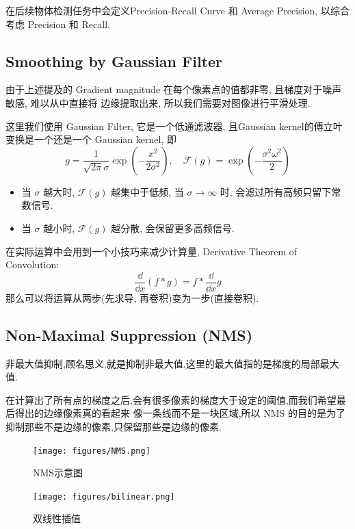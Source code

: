 在后续物体检测任务中会定义Precision-Recall Curve 和 Average Precision, 以综合考虑 Precision 和 Recall.

\subsection{Smoothing by Gaussian Filter}
由于上述提及的 Gradient magnitude 在每个像素点的值都非零, 且梯度对于噪声敏感, 难以从中直接将
边缘提取出来, 所以我们需要对图像进行平滑处理. 

这里我们使用 Gaussian Filter, 它是一个低通滤波器, 且Gaussian kernel的傅立叶变换是一个还是一个 Gaussian kernel, 即
\[
    g = \frac{1}{\sqrt{2\pi}\sigma} \exp\left( -\frac{x^2}{2\sigma^2} \right), \quad \mathcal{F}(g) = \exp \left( -\frac{\sigma^2\omega^2}{2} \right)
\]
\begin{itemize}
    \item 当 $\sigma$ 越大时, $\mathcal{F}(g)$ 越集中于低频, 当 $\sigma \to \infty$ 时, 会滤过所有高频只留下常数信号.
    \item 当 $\sigma$ 越小时, $\mathcal{F}(g)$ 越分散, 会保留更多高频信号.
\end{itemize}
在实际运算中会用到一个小技巧来减少计算量, Derivative Theorem of Convolution:
\[
\frac{\dd }{\dd x} (f * g) = f * \frac{\dd }{\dd x} g
\]
那么可以将运算从两步(先求导, 再卷积)变为一步(直接卷积).


\subsection{Non-Maximal Suppression (NMS)}

非最大值抑制,顾名思义,就是抑制非最大值,这里的最大值指的是梯度的局部最大值.

在计算出了所有点的梯度之后,会有很多像素的梯度大于设定的阈值,而我们希望最后得出的边缘像素真的看起来
像一条线而不是一块区域,所以 NMS 的目的是为了抑制那些不是边缘的像素,只保留那些是边缘的像素.

\begin{figure}[htbp]
    \centering
    \begin{minipage}[t]{0.45\textwidth}
        \centering
        \texttt{[image: figures/NMS.png]}
        \caption{NMS示意图}
    \end{minipage}
    \begin{minipage}[t]{0.45\textwidth}
        \centering
        \texttt{[image: figures/bilinear.png]}
        \caption{双线性插值}
    \end{minipage}
\end{figure}

